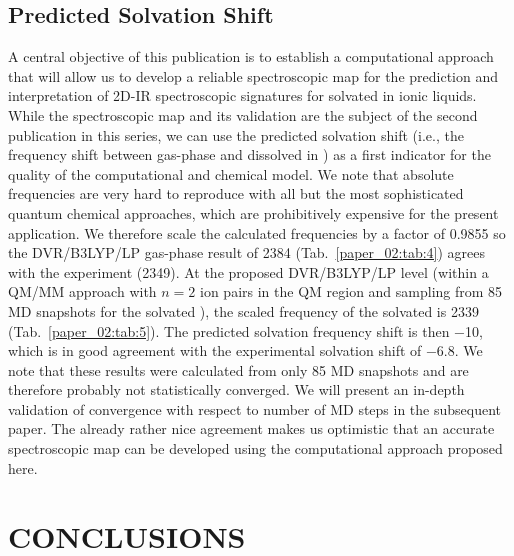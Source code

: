 \documentclass[%
  class = book,%
  crop = false,%
  float = true,%
  multi = true,%
  preview = false,%
]{standalone}
\newcommand{\caps}[1]{\uppercase{#1}}
\begin{document}
\subsection{Predicted Solvation Shift}
\label{paper_02:ssec:IIIF}

A central objective of this publication is to establish a computational approach that will allow us to develop a reliable spectroscopic map for the prediction and interpretation of 2D-IR spectroscopic signatures for  solvated in ionic liquids. While the spectroscopic map and its validation are the subject of the second publication in this series, we can use the predicted solvation shift (i.e., the frequency shift between gas-phase  and dissolved in \ce{[C4C1im][PF6]}) as a first indicator for the quality of the computational and chemical model. We note that absolute frequencies are very hard to reproduce with all but the most sophisticated quantum chemical approaches, which are prohibitively expensive for the present application. We therefore scale the calculated frequencies by a factor of \num{0.9855} so the DVR/B3LYP/LP gas-phase result of \SI{2384}{\wavenumber} (Tab.~\ref{paper_02:tab:4}) agrees with the experiment (\SI{2349}{\wavenumber}). At the proposed DVR/B3LYP/LP level (within a QM/MM approach with \(n = 2\) ion pairs in the QM region and sampling from \num{85} MD snapshots for the solvated ), the scaled frequency of the solvated  is \SI{2339}{\wavenumber} (Tab.~\ref{paper_02:tab:5}). The predicted solvation frequency shift is then \SI{-10}{\wavenumber}, which is in good agreement with the experimental solvation shift of \SI{-6.8}{\wavenumber}. We note that these results were calculated from only \num{85} MD snapshots and are therefore probably not statistically converged. We will present an in-depth validation of convergence with respect to number of MD steps in the subsequent paper. The already rather nice agreement makes us optimistic that an accurate spectroscopic map can be developed using the computational approach proposed here.

\section{\texorpdfstring{\caps{Conclusions}}{Conclusions}}
\label{paper_02:sec:IV}
\end{document}
